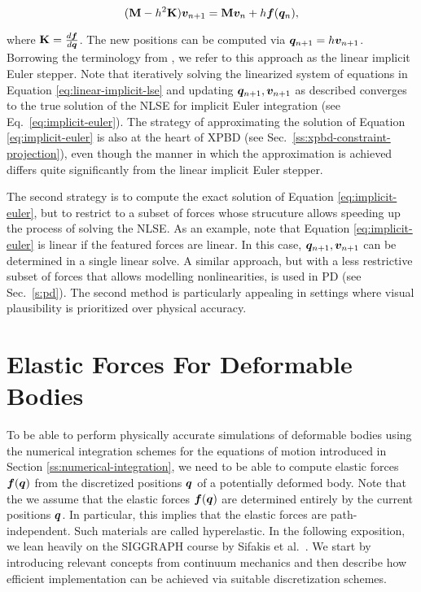 \begin{equation}\label{eq:linear-implicit-stepper}
    (\mathbf{M} - h^2\mathbf{K})\bm{v}_{n+1} = \mathbf{M}\bm{v}_n + h\bm{f}(\bm{q}_n),
\end{equation}

\noindent where $\mathbf{K} = \frac{d\bm{f}}{d\bm{q}}$. The new positions can be computed via $\bm{q}_{n+1} = h \bm{v}_{n+1}$. 
Borrowing the terminology from \cite{servin2006}, we refer to this approach as the linear implicit Euler stepper. Note that iteratively solving
the linearized system of equations in Equation \ref{eq:linear-implicit-lse} and updating $\bm{q}_{n+1}, \bm{v}_{n+1}$ as described converges to 
the true solution of the NLSE for implicit Euler integration (see Eq.\ \ref{eq:implicit-euler}). The strategy of approximating the solution of 
Equation \ref{eq:implicit-euler} is also at the heart of XPBD (see Sec.\ \ref{ss:xpbd-constraint-projection}), even though the manner in which the 
approximation is achieved differs quite significantly from the linear implicit Euler stepper.

The second strategy is to compute the exact solution of Equation \ref{eq:implicit-euler}, but to restrict to a subset of forces whose strucuture 
allows speeding up the process of solving the NLSE. As an example, note that Equation \ref{eq:implicit-euler} is linear if the featured forces 
are linear. In this case, $\bm{q}_{n+1}, \bm{v}_{n+1}$ can be determined in a single linear solve. A similar approach, but with a less 
restrictive subset of forces that allows modelling nonlinearities, is used in PD (see Sec.\ \ref{s:pd}). The second method is particularly appealing 
in settings where visual plausibility is prioritized over physical accuracy.

\section{Elastic Forces For Deformable Bodies}\label{ss:deformable-bodies}
To be able to perform physically accurate simulations of deformable bodies using the numerical integration schemes for the equations of motion 
introduced in Section \ref{ss:numerical-integration}, we need to be able to compute elastic forces $\bm{f}(\bm{q})$ from the discretized 
positions $\bm{q}$ of a potentially deformed body. Note that the we assume that the elastic forces $\bm{f}(\bm{q})$ are determined 
entirely by the current positions $\bm{q}$. In particular, this implies that the elastic forces are path-independent. Such materials are called 
hyperelastic. In the following exposition, we lean heavily on the SIGGRAPH course by Sifakis et al.\ \cite{sifakis2012}. We start by 
introducing relevant concepts from continuum mechanics and then describe how efficient implementation can be achieved via suitable 
discretization schemes.

